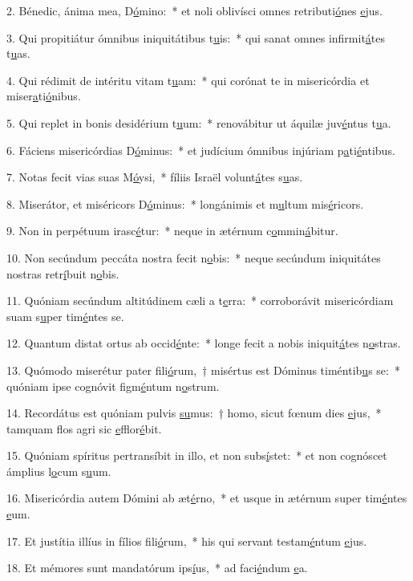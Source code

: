 2. Bénedic, ánima mea, D\uline{ó}mino:~* et noli oblivísci omnes retributi\uline{ó}nes \uline{e}jus.\par 
3. Qui propitiátur ómnibus iniquitátibus t\uline{u}is:~* qui sanat omnes infirmit\uline{á}tes t\uline{u}as.\par 
4. Qui rédimit de intéritu vitam t\uline{u}am:~* qui corónat te in misericórdia et miser\uline{a}ti\uline{ó}nibus.\par 
5. Qui replet in bonis desidérium t\uline{u}um:~* renovábitur ut áquilæ juv\uline{é}ntus t\uline{u}a.\par 
6. Fáciens misericórdias D\uline{ó}minus:~* et judícium ómnibus injúriam p\uline{a}ti\uline{é}ntibus.\par 
7. Notas fecit vias suas M\uline{ó}ysi,~* fíliis Israël volunt\uline{á}tes s\uline{u}as.\par 
8. Miserátor, et miséricors D\uline{ó}minus:~* longánimis et m\uline{u}ltum mis\uline{é}ricors.\par 
9. Non in perpétuum irasc\uline{é}tur:~* neque in ætérnum c\uline{o}mmin\uline{á}bitur.\par 
10. Non secúndum peccáta nostra fecit n\uline{o}bis:~* neque secúndum iniquitátes nostras retr\uline{í}buit n\uline{o}bis.\par 
11. Quóniam secúndum altitúdinem cæli a t\uline{e}rra:~* corroborávit misericórdiam suam s\uline{u}per tim\uline{é}ntes se.\par 
12. Quantum distat ortus ab occid\uline{é}nte:~* longe fecit a nobis iniquit\uline{á}tes n\uline{o}stras.\par 
13. Quómodo miserétur pater fili\uline{ó}rum,~† misértus est Dóminus timéntib\uline{u}s se:~* quóniam ipse cognóvit figm\uline{é}ntum n\uline{o}strum.\par 
14. Recordátus est quóniam pulvis \uline{su}mus:~† homo, sicut fœnum dies \uline{e}jus,~* tamquam flos agri sic \uline{e}fflor\uline{é}bit.\par 
15. Quóniam spíritus pertransíbit in illo, et non subs\uline{í}stet:~* et non cognóscet ámplius l\uline{o}cum s\uline{u}um.\par 
16. Misericórdia autem Dómini ab æt\uline{é}rno,~* et usque in ætérnum super tim\uline{é}ntes \uline{e}um.\par 
17. Et justítia illíus in fílios fili\uline{ó}rum,~* his qui servant testam\uline{é}ntum \uline{e}jus.\par 
18. Et mémores sunt mandatórum ips\uline{í}us,~* ad faci\uline{é}ndum \uline{e}a.\par 
